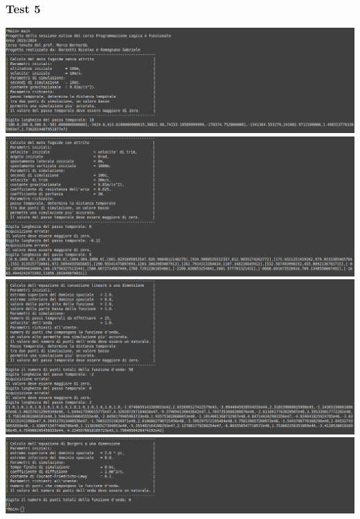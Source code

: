 \subsubsection*{Test 5}
\includegraphics[width=\textwidth,height=\textheight,keepaspectratio]{05_testing/image/hs/05_test/01_misto.png}
\\
\includegraphics[width=\textwidth,height=\textheight,keepaspectratio]{05_testing/image/hs/05_test/02_misto.png}
\\
\includegraphics[width=\textwidth,height=\textheight,keepaspectratio]{05_testing/image/hs/05_test/03_misto.png}
\\
\includegraphics[width=\textwidth,height=\textheight,keepaspectratio]{05_testing/image/hs/05_test/04_misto.png}


